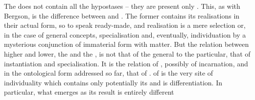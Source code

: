 The  does not  contain all the hypostases -- they are
present only .  This, as with Bergson, is the difference between
 and .  The former contains its realisations in
their actual form, so to speak ready-made, and realisation is a mere selection
or, in the case of general concepts, specialisation and, eventually,
individuation by a mysterious conjunction of immaterial form with matter.  But
the relation between higher and lower, the  and the ,
is not that of the general to the particular, that of instantiation and
specialisation. It is the relation of , possibly of incarnation,
and in the ontological form addressed so far, that of .
 of  is the very site of individuality which contains
only potentially its  and  is
differentiation.  In particular, what emerges as its result is entirely different
